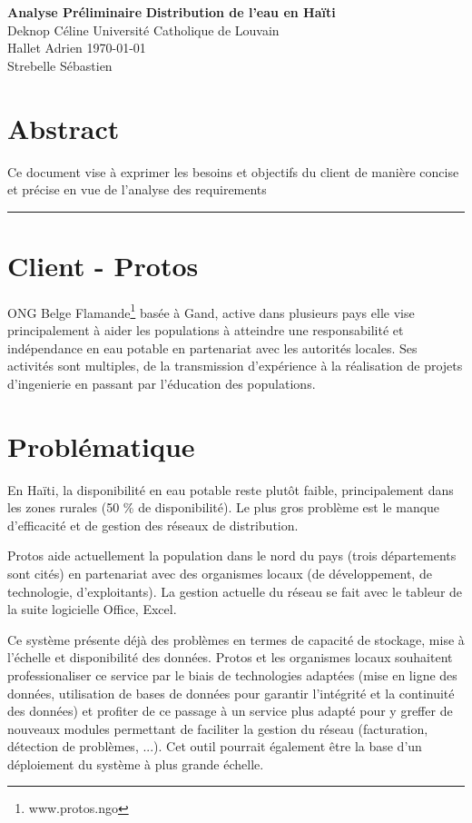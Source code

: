 \documentclass[a4paper, 11pt]{article}
\begin{document}
\noindent
\large\textbf{Analyse Préliminaire} \hfill \textbf{Distribution de l'eau en Haïti} \\
\normalsize Deknop Céline \hfill Université Catholique de Louvain \\
Hallet Adrien \hfill \today \\
Strebelle Sébastien

\section*{Abstract}
Ce document vise à exprimer les besoins et objectifs du client de manière concise et précise en vue de l'analyse des requirements

\hrule

\section*{Client - Protos}
ONG Belge Flamande\footnote{www.protos.ngo} basée à Gand, active dans plusieurs pays elle vise principalement à aider les populations à atteindre une responsabilité et indépendance en eau potable en partenariat avec les autorités locales. Ses activités sont multiples, de la transmission d'expérience à la réalisation de projets d'ingenierie en passant par l'éducation des populations.

\section*{Problématique}
En Haïti, la disponibilité en eau potable reste plutôt faible, principalement dans les zones rurales (50 \% de disponibilité). Le plus gros problème est le manque d'efficacité et de gestion des réseaux de distribution.

Protos aide actuellement la population dans le nord du pays (trois départements sont cités) en partenariat avec des organismes locaux (de développement, de technologie, d'exploitants). La gestion actuelle du réseau se fait avec le tableur de la suite logicielle Office, Excel.

Ce système présente déjà des problèmes en termes de capacité de stockage, mise à l'échelle et disponibilité des données. Protos et les organismes locaux souhaitent professionaliser ce service par le biais de technologies adaptées (mise en ligne des données, utilisation de bases de données pour garantir l'intégrité et la continuité des données) et profiter de ce passage à un service plus adapté pour y greffer de nouveaux modules permettant de faciliter la gestion du réseau (facturation, détection de problèmes, ...). Cet outil pourrait également être la base d'un déploiement du système à plus grande échelle.
\end{document}
